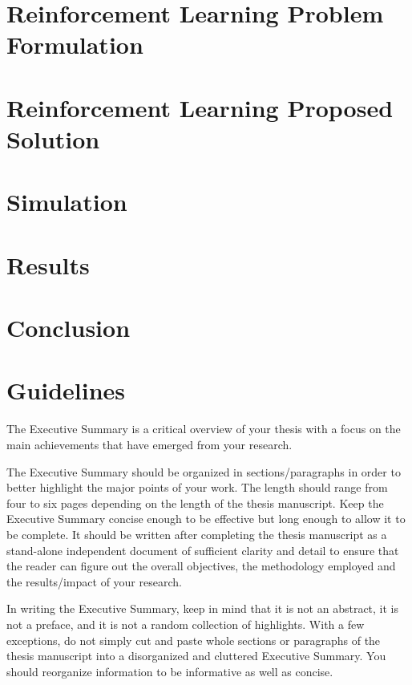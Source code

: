 \documentclass[11pt,a4paper,twocolumn]{article}
\begin{document}
\section{Reinforcement Learning Problem Formulation}

\section{Reinforcement Learning Proposed Solution}

\section{Simulation}

\section{Results}

\section{Conclusion}

\section{Guidelines}
\label{sec:guidelines}

The Executive Summary is a critical overview of your thesis
with a focus on the main achievements that have emerged from your research.

The Executive Summary should be organized in sections/paragraphs
in order to better highlight the major points of your work.
The length should range from four to six pages depending on the length of the thesis manuscript.
Keep the Executive Summary concise enough to be effective but long enough to allow it to be complete.
It should be written after completing the thesis manuscript as a stand-alone independent document
of sufficient clarity and detail to ensure that the reader can figure out the overall objectives,
the methodology employed and the results/impact of your research.

In writing the Executive Summary, keep in mind that it is not an abstract, it is not a preface,
and it is not a random collection of highlights.
With a few exceptions, do not simply cut and paste whole sections or paragraphs of the thesis manuscript
into a disorganized and cluttered Executive Summary.
You should reorganize information to be informative as well as concise.
\end{document}
